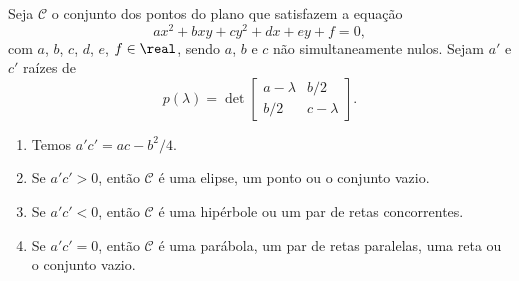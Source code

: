 \begin{teorema}
  Seja $\mathcal{C}$ o conjunto dos pontos do plano que satisfazem a equação
  \[
    ax^2 + bxy + cy^2 + dx + ey + f = 0,
  \]
  com $a$, $b$, $c$, $d$, $e$, $f \in \real$, sendo $a$, $b$ e $c$ não simultaneamente nulos. Sejam $a'$ e $c'$ raízes de
  \[
    p(\lambda) = \det \begin{bmatrix}
      a - \lambda & b/2\\
      b/2 & c - \lambda
    \end{bmatrix}.
  \]
  \begin{enumerate}[label=({\roman*})]
    \item Temos $a'c' = ac - b^2/4$.
    \item Se $a'c' > 0$, então $\mathcal{C}$ é uma elipse, um ponto ou o conjunto vazio.
    \item Se $a'c' < 0$, então $\mathcal{C}$ é uma hipérbole ou um par de retas concorrentes.
    \item Se $a'c' = 0$, então $\mathcal{C}$ é uma par\'abola, um par de retas paralelas, uma reta ou o conjunto vazio.
  \end{enumerate}
\end{teorema}



